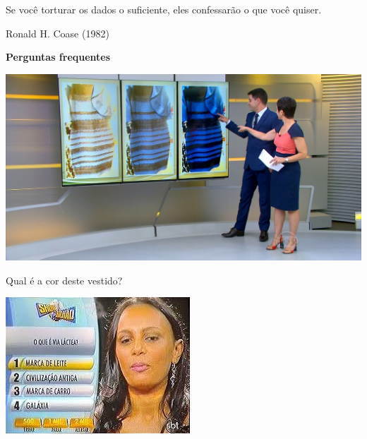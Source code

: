 \documentclass{beamer}
\begin{document}
\begin{frame}{}
  \begin{block}{}
    Se você torturar os dados o suficiente, eles confessarão o que você quiser.
  \end{block}
\hfill Ronald H. Coase (1982)
\end{frame}

\begin{frame}
  \begin{center}
    {\bf Perguntas frequentes}
  \end{center}
\end{frame}

\begin{frame}
  \begin{center}
    \includegraphics[width=\textwidth]{Imagens/pergunta1}

    Qual é a cor deste vestido?
  \end{center}
\end{frame}

\begin{frame}
  \begin{center}
    \includegraphics[width=.7\textwidth]{Imagens/pergunta2}
  \end{center}
\end{frame}
\end{document}

